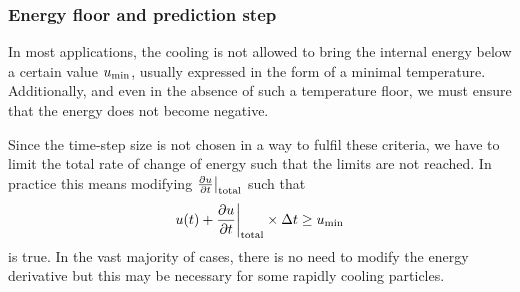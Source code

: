 \documentclass[fleqn, usenatbib, useAMS, a4paper]{mnras}
\begin{document}
\subsubsection{Energy floor and prediction step}

In most applications, the cooling is not allowed to bring the internal
energy below a certain value $u_{\rm min}$, usually expressed in the
form of a minimal temperature. Additionally, and even in the absence
of such a temperature floor, we must ensure that the energy does not
become negative.

Since the time-step size is not chosen in a way to fulfil these
criteria, we have to limit the total rate of change of energy such
that the limits are not reached. In practice this means modifying
$\frac{\partial u}{\partial t}\big|_{\rm total}$ such that
\begin{equation}
  u(t) + \frac{\partial u}{\partial t}\bigg|_{\rm total} \times \Delta t \geq
  u_{\rm min}
\end{equation}
is true. In the vast majority of cases, there is no need to modify the
energy derivative but this may be necessary for some rapidly cooling
particles.
\end{document}

